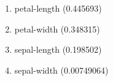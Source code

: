 \begin{enumerate}
\item petal-length (0.445693)
\item petal-width (0.348315)
\item sepal-length (0.198502)
\item sepal-width (0.00749064)
\end{enumerate}